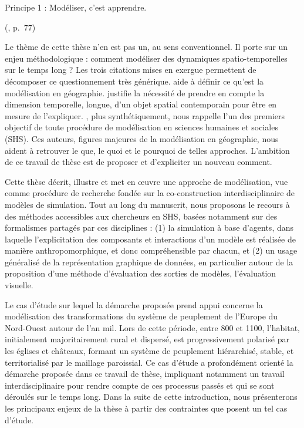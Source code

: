 \vspace*{-2.5em}\epigraph{
	\og Principe 1 : Modéliser, c'est apprendre\fg{}.
}{ (\citeyear{banos_pour_2013}, p.~77)}


Le \og thème\fg{} de cette thèse n'en est pas un, au sens conventionnel.
Il porte sur un enjeu méthodologique : comment modéliser des dynamiques spatio-temporelles sur le temps long ?
Les trois citations mises en exergue permettent de décomposer ce questionnement très générique.
 aide à définir ce qu'est la modélisation en géographie.
 justifie la nécessité de prendre en compte la dimension temporelle, longue, d'un objet spatial contemporain pour être en mesure de l'\og{}expliquer\fg{}.
, plus synthétiquement, nous rappelle l'un des premiers objectif de toute procédure de modélisation en sciences humaines et sociales (SHS).
Ces auteurs, figures majeures de la modélisation en géographie, nous aident à retrouver le \og que\fg{}, le \og quoi\fg{} et le \og pourquoi\fg{} de telles approches.
L'ambition de ce travail de thèse est de proposer et d'expliciter un nouveau \og comment\fg{}.

Cette thèse décrit, illustre et met en œuvre une approche de modélisation, vue comme \og procédure de recherche\fg{} \autocite{brunet2000modeles} fondée sur la co-construction interdisciplinaire de modèles de simulation.
Tout au long du manuscrit, nous proposons le recours à des méthodes accessibles aux chercheurs en SHS, basées notamment sur des formalismes partagés par ces disciplines : (1) la simulation à base d'agents, dans laquelle l'explicitation des composants et interactions d'un modèle est réalisée de manière anthropomorphique, et donc compréhensible par chacun, et (2) un usage généralisé de la représentation graphique de données, en particulier autour de la proposition d'une méthode d'évaluation des sorties de modèles, l'\og{}évaluation visuelle\fg{}.

Le cas d'étude sur lequel la démarche proposée prend appui concerne la modélisation des transformations du système de peuplement de l'Europe du Nord-Ouest autour de l'an mil.
Lors de cette période, entre 800 et 1100, l'habitat, initialement majoritairement rural et dispersé, est progressivement polarisé par les églises et châteaux, formant un système de peuplement hiérarchisé, stable, et territorialisé par le maillage paroissial.
Ce cas d'étude a profondément orienté la démarche proposée dans ce travail de thèse, impliquant notamment un travail interdisciplinaire pour rendre compte de ces processus passés et qui se sont déroulés sur le temps long.
Dans la suite de cette introduction, nous présenterons les principaux enjeux de la thèse à partir des contraintes que posent un tel cas d'étude.

